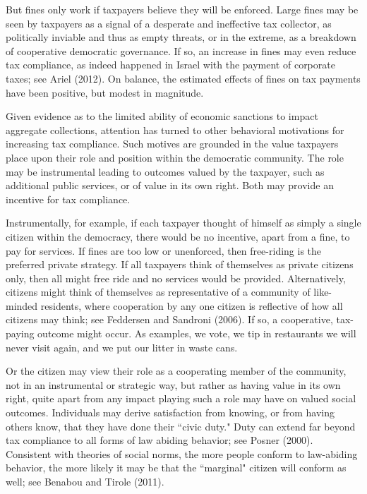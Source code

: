 \documentclass[12pt,titlepage]{article}
\begin{document}
But fines only work if taxpayers believe they will be enforced.  Large
fines may be seen by taxpayers as a signal of a desperate and
ineffective tax collector, as politically inviable and thus as empty
threats, or in the extreme, as a breakdown of cooperative democratic
governance.  If so, an increase in fines may even reduce tax
compliance, as indeed happened in Israel with the payment of corporate
taxes; see Ariel (2012).  On balance, the estimated effects of fines
on tax payments have been positive, but modest in magnitude.

Given evidence as to the limited ability of economic sanctions to
impact aggregate collections, attention has turned to other behavioral
motivations for increasing tax compliance.  Such motives are grounded
in the value taxpayers place upon their role and position within the
democratic community.  The role may be instrumental leading to
outcomes valued by the taxpayer, such as additional public services,
or of value in its own right.  Both may provide an incentive for tax
compliance.

Instrumentally, for example, if each taxpayer thought of himself as
simply a single citizen within the democracy, there would be no
incentive, apart from a fine, to pay for services.  If fines are too
low or unenforced, then free-riding is the preferred private strategy.
If all taxpayers think of themselves as private citizens only, then
all might free ride and no services would be provided.  Alternatively,
citizens might think of themselves as representative of a community of
like-minded residents, where cooperation by any one citizen is
reflective of how all citizens may think; see Feddersen and Sandroni
(2006).  If so, a cooperative, tax-paying outcome might occur.  As
examples, we vote, we tip in restaurants we will never visit again,
and we put our litter in waste cans.

Or the citizen may view their role as a cooperating member of the
community, not in an instrumental or strategic way, but rather as
having value in its own right, quite apart from any impact playing
such a role may have on valued social outcomes.  Individuals may
derive satisfaction from knowing, or from having others know, that
they have done their ``civic duty."  Duty can extend far beyond tax
compliance to all forms of law abiding behavior; see Posner (2000).
Consistent with theories of social norms, the more people conform to
law-abiding behavior, the more likely it may be that the ``marginal"
citizen will conform as well; see Benabou and Tirole (2011).
\end{document}
